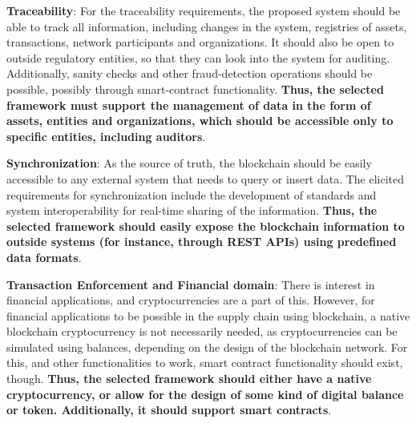 \par \textbf{Traceability}: For the traceability requirements, the proposed system should be able to track all information, including changes in the system, registries of assets, transactions, network participants and organizations. It should also be open to outside regulatory entities, so that they can look into the system for auditing. Additionally, sanity checks and other fraud-detection operations should be possible, possibly through smart-contract functionality. \textbf{Thus, the selected framework must support the management of data in the form of assets, entities and organizations, which should be accessible only to specific entities, including auditors}.

\par \textbf{Synchronization}: As the source of truth, the blockchain should be easily accessible to any external system that needs to query or insert data. The elicited requirements for synchronization include the development of standards and system interoperability for real-time sharing of the information. \textbf{Thus, the selected framework should easily expose the blockchain information to outside systems (for instance, through REST APIs) using predefined data formats}.

\par \textbf{Transaction Enforcement and Financial domain}: There is interest in financial applications, and cryptocurrencies are a part of this. However, for financial applications to be possible in the supply chain using blockchain, a native blockchain cryptocurrency is not necessarily needed, as cryptocurrencies can be simulated using balances, depending on the design of the blockchain network. For this, and other functionalities to work, smart contract functionality should exist, though. \textbf{Thus, the selected framework should either have a native cryptocurrency, or allow for the design of some kind of digital balance or token. Additionally, it should support smart contracts}.



